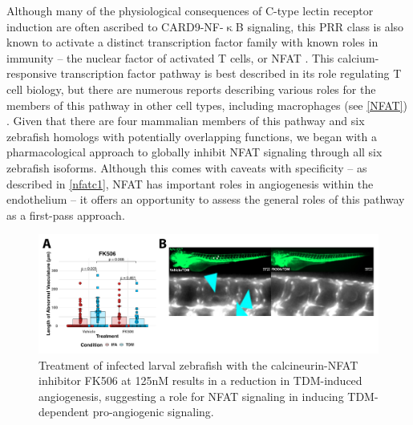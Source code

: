 Although many of the physiological consequences of C-type lectin receptor induction are often ascribed to CARD9-NF-$\upkappa$B signaling, this PRR class is also known to activate a distinct transcription factor family with known roles in immunity -- the nuclear factor of activated T cells, or NFAT \citep{Goodridge2007, Deerhake2021}. This calcium-responsive transcription factor pathway is best described in its role regulating T cell biology, but there are numerous reports describing various roles for the members of this pathway in other cell types, including macrophages (see \autoref{NFAT}) \citep{Symes1998, Jones2000, Crabtree2002, Horsley2002, Elloumi2012}. Given that there are four mammalian members of this pathway and six zebrafish homologs with potentially overlapping functions, we began with a pharmacological approach to globally inhibit NFAT signaling through all six zebrafish isoforms. Although this comes with caveats with specificity -- as described in \autoref{nfatc1}, NFAT has important roles in angiogenesis within the endothelium -- it offers an opportunity to assess the general roles of this pathway as a first-pass approach. 

\begin{figure}
\centering
\includegraphics[width=\textwidth]{images/fk506tdm.pdf}
\caption{Treatment of infected larval zebrafish with the calcineurin-NFAT inhibitor FK506 at 125nM results in a reduction in TDM-induced angiogenesis, suggesting a role for NFAT signaling in inducing TDM-dependent pro-angiogenic signaling.}
\label{figure:fk506tdm}
\end{figure}

